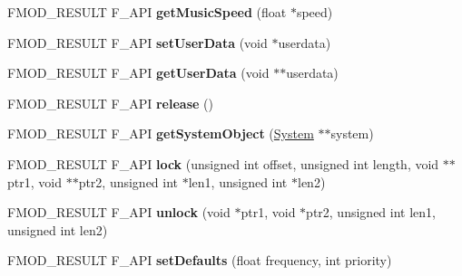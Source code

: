 \begin{DoxyCompactItemize}
\item 
\hypertarget{class_f_m_o_d_1_1_sound_a22e4865bfd9f4bf40633671439dade82}{F\+M\+O\+D\+\_\+\+R\+E\+S\+U\+L\+T F\+\_\+\+A\+P\+I {\bfseries get\+Music\+Speed} (float $\ast$speed)}\label{class_f_m_o_d_1_1_sound_a22e4865bfd9f4bf40633671439dade82}

\item 
\hypertarget{class_f_m_o_d_1_1_sound_ac921f8c260ef5b396a837016d5882713}{F\+M\+O\+D\+\_\+\+R\+E\+S\+U\+L\+T F\+\_\+\+A\+P\+I {\bfseries set\+User\+Data} (void $\ast$userdata)}\label{class_f_m_o_d_1_1_sound_ac921f8c260ef5b396a837016d5882713}

\item 
\hypertarget{class_f_m_o_d_1_1_sound_a829f8e68b254764374c38e6e23f7f8df}{F\+M\+O\+D\+\_\+\+R\+E\+S\+U\+L\+T F\+\_\+\+A\+P\+I {\bfseries get\+User\+Data} (void $\ast$$\ast$userdata)}\label{class_f_m_o_d_1_1_sound_a829f8e68b254764374c38e6e23f7f8df}

\item 
\hypertarget{class_f_m_o_d_1_1_sound_ab0d8425b6f8ad26b4011dc36fee9948c}{F\+M\+O\+D\+\_\+\+R\+E\+S\+U\+L\+T F\+\_\+\+A\+P\+I {\bfseries release} ()}\label{class_f_m_o_d_1_1_sound_ab0d8425b6f8ad26b4011dc36fee9948c}

\item 
\hypertarget{class_f_m_o_d_1_1_sound_aed24d7342fc12299472454730828987e}{F\+M\+O\+D\+\_\+\+R\+E\+S\+U\+L\+T F\+\_\+\+A\+P\+I {\bfseries get\+System\+Object} (\hyperlink{class_f_m_o_d_1_1_system}{System} $\ast$$\ast$system)}\label{class_f_m_o_d_1_1_sound_aed24d7342fc12299472454730828987e}

\item 
\hypertarget{class_f_m_o_d_1_1_sound_a0f83fccead6df86323a21a0ae0207c61}{F\+M\+O\+D\+\_\+\+R\+E\+S\+U\+L\+T F\+\_\+\+A\+P\+I {\bfseries lock} (unsigned int offset, unsigned int length, void $\ast$$\ast$ptr1, void $\ast$$\ast$ptr2, unsigned int $\ast$len1, unsigned int $\ast$len2)}\label{class_f_m_o_d_1_1_sound_a0f83fccead6df86323a21a0ae0207c61}

\item 
\hypertarget{class_f_m_o_d_1_1_sound_ab80dbd8fdc67d3b4c0358de311865da3}{F\+M\+O\+D\+\_\+\+R\+E\+S\+U\+L\+T F\+\_\+\+A\+P\+I {\bfseries unlock} (void $\ast$ptr1, void $\ast$ptr2, unsigned int len1, unsigned int len2)}\label{class_f_m_o_d_1_1_sound_ab80dbd8fdc67d3b4c0358de311865da3}

\item 
\hypertarget{class_f_m_o_d_1_1_sound_a50de3be9a532bfa635f7e2ba0b0b8a1e}{F\+M\+O\+D\+\_\+\+R\+E\+S\+U\+L\+T F\+\_\+\+A\+P\+I {\bfseries set\+Defaults} (float frequency, int priority)}\label{class_f_m_o_d_1_1_sound_a50de3be9a532bfa635f7e2ba0b0b8a1e}


\end{DoxyCompactItemize}

